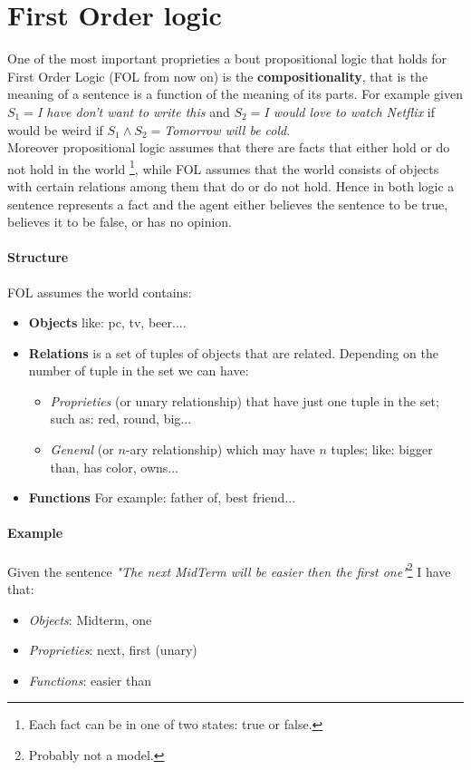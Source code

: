 \documentclass[10pt,a4paper]{article}
\begin{document}
\newpage
\section{First Order logic}

One of the most important proprieties a bout propositional logic that holds for First Order Logic (FOL from now on) is the \textbf{compositionality}, that is the meaning of a sentence is a function of the meaning of its parts. For example given $S_1=$\textit{I have don't want to write this} and $S_2=$\textit{I would love to watch Netflix} if would be weird if $S_1 \wedge S_2=$\textit{Tomorrow will be cold}.\\
Moreover propositional logic assumes that there are facts that either hold or do not hold in the world \footnote{Each fact can be in one of two states: true or false.}, while FOL assumes that the world consists of objects with certain relations among them that do or do not hold. Hence in both logic a sentence represents a fact and the agent either believes the sentence to be true, believes it to be false, or has no opinion. 

\paragraph{Structure}
FOL assumes the world contains:
\begin{itemize}
\item \textbf{Objects} like: pc, tv, beer....
\item \textbf{Relations} is a set of tuples of objects that are related. Depending on the number of tuple in the set we can have:
	\begin{itemize}
	\item \textit{Proprieties} (or unary relationship) that have just one tuple in the set; such as: red, round, big...
	\item \textit{General} (or $n$-ary relationship)  which may have $n$ tuples; like: bigger than, has color, owns...
	\end{itemize}

\item \textbf{Functions}  For example: father of, best friend...
\end{itemize}

\paragraph{Example}
Given the sentence \textit{"The next MidTerm will be easier then the first one"}\footnote{Probably not a model.} I have that:
\begin{itemize}
\item \textit{Objects}: Midterm, one
\item \textit{Proprieties}: next, first (unary)
\item \textit{Functions}: easier than
\end{itemize}
\end{document}
